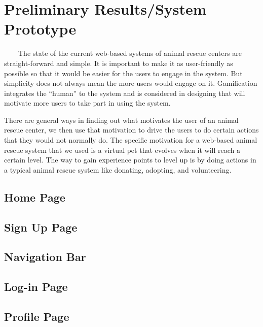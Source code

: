 \chapter{Preliminary Results/System Prototype}

~~~~The state of the current web-based systems of animal rescue centers are straight-forward and simple. It is important to make it as user-friendly as possible so that it would be easier for the users to engage in the system. But simplicity does not always mean the more users would engage on it. Gamification integrates the “human” to the system and is considered in designing that will motivate more users to take part in using the system.

There are general ways in finding out what motivates the user of an animal rescue center, we then use that motivation to drive the users to do certain actions that they would not normally do. The specific motivation for a web-based animal rescue system that we used is a virtual pet that evolves when it will reach a certain level. The way to gain experience points to level up is by doing actions in a typical animal rescue system like donating, adopting, and volunteering. 

\section{Home Page}
\section{Sign Up Page}
\section{Navigation Bar}
\section{Log-in Page}
\section{Profile Page}
